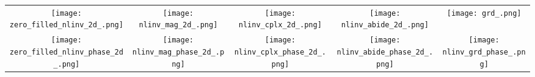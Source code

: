 {
    \renewcommand{\arraystretch}{0}

\begin{tabular}{c @{\hskip 0pt} c @{\hskip 0pt} c @{\hskip 0pt} c@{\hskip 0pt} c}
    \texttt{[image: zero\_filled\_nlinv\_2d\_.png]}&
    \texttt{[image: nlinv\_mag\_2d\_.png]}&
    \texttt{[image: nlinv\_cplx\_2d\_.png]}&
    \texttt{[image: nlinv\_abide\_2d\_.png]}&
    \texttt{[image: grd\_.png]}\\
    \texttt{[image: zero\_filled\_nlinv\_phase\_2d\_.png]}&
    \texttt{[image: nlinv\_mag\_phase\_2d\_.png]}&
    \texttt{[image: nlinv\_cplx\_phase\_2d\_.png]}&
    \texttt{[image: nlinv\_abide\_phase\_2d\_.png]}&
    \texttt{[image: nlinv\_grd\_phase\_.png]}
\end{tabular}}
